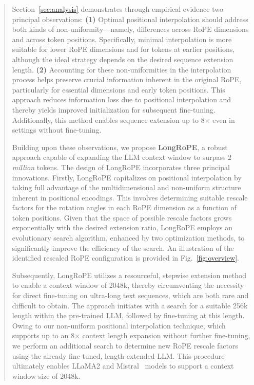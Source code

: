 \begin{abstract}
Section~\ref{sec:analysis} demonstrates through empirical evidence two principal observations: \textbf{(1)} Optimal positional interpolation should address both kinds of non-uniformity—namely, differences across RoPE dimensions and across token positions. Specifically, minimal interpolation is more suitable for lower RoPE dimensions and for tokens at earlier positions, although the ideal strategy depends on the desired sequence extension length. \textbf{(2)} Accounting for these non-uniformities in the interpolation process helps preserve crucial information inherent in the original RoPE, particularly for essential dimensions and early token positions. This approach reduces information loss due to positional interpolation and thereby yields improved initialization for subsequent fine-tuning. Additionally, this method enables sequence extension up to 8$\times$ even in settings without fine-tuning.

Building upon these observations, we propose \textbf{LongRoPE}, a robust approach capable of expanding the LLM context window to surpass 2 \emph{million} tokens. The design of LongRoPE incorporates three principal innovations. Firstly, {LongRoPE} capitalizes on positional interpolation by taking full advantage of the multidimensional and non-uniform structure inherent in positional encodings. This involves determining suitable rescale factors for the rotation angles in each RoPE dimension as a function of token positions. Given that the space of possible rescale factors grows exponentially with the desired extension ratio, {LongRoPE} employs an evolutionary search algorithm, enhanced by two optimization methods, to significantly improve the efficiency of the search. An illustration of the identified rescaled RoPE configuration is provided in Fig.~\ref{fig:overview}.

Subsequently, {LongRoPE} utilizes a resourceful, stepwise extension method to enable a context window of 2048k, thereby circumventing the necessity for direct fine-tuning on ultra-long text sequences, which are both rare and difficult to obtain. The approach initiates with a search for a suitable 256k length within the pre-trained LLM, followed by fine-tuning at this length. Owing to our non-uniform positional interpolation technique, which supports up to an 8$\times$ context length expansion without further fine-tuning, we perform an additional search to determine new RoPE rescale factors using the already fine-tuned, length-extended LLM. This procedure ultimately enables LLaMA2 and Mistral~\cite{mistral} models to support a context window size of 2048k.


\end{abstract}
